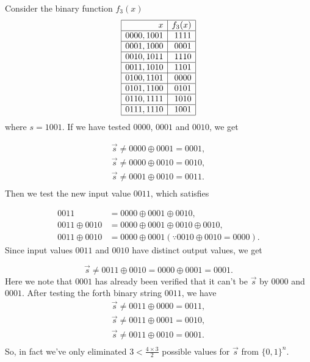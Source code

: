 \begin{example}
Consider the binary function $f_3(x)$
\begin{equation}
    \begin{array}{|r|r|}
	\hline x & f_3(x) \\
	\hline 0000,1001 & 1111 \\
	\hline 0001,1000 & 0001 \\
	\hline 0010,1011 & 1110 \\
	\hline 0011,1010 & 1101 \\
	\hline 0100,1101 & 0000 \\
	\hline 0101,1100 & 0101 \\
	\hline 0110,1111 & 1010 \\
	\hline 0111,1110 & 1001 \\
	\hline
\end{array}
\end{equation}
where $s=1001$. If we have tested $0000$, $0001$ and $0010$, we get

\begin{equation}
\begin{aligned}
	\vec{s} \neq 0000 \oplus 0001 = 0001, \\
	\vec{s} \neq 0000 \oplus 0010 = 0010, \\
	\vec{s} \neq 0001 \oplus 0010 = 0011. \\
\end{aligned}
\end{equation}
Then we test the new input value $0011$, which satisfies

\begin{equation}
\begin{aligned}
0011 &= 0000 \oplus 0001 \oplus 0010,\\
0011 \oplus 0010 &= 0000 \oplus 0001 \oplus0010 \oplus0010 ,\\
0011 \oplus 0010 &= 0000 \oplus 0001 (\because 0010 \oplus 0010 = 0000).
\end{aligned}
\end{equation}
Since input values $0011$ and $0010$ have distinct output values, we get 

\begin{equation}
    \vec{s} \neq 0011 \oplus 0010 = 0000 \oplus 0001 = 0001.
\end{equation}
Here we note that $0001$ has already been verified that it can't be $\vec{s}$ by $0000$ and $0001$. After testing the forth binary string $0011$, we have
\begin{equation}
\begin{aligned}
	\vec{s} \neq 0011 \oplus 0000 = 0011, \\
	\vec{s} \neq 0011 \oplus 0001 = 0010, \\
	\vec{s} \neq 0011 \oplus 0010 = 0001. \\
\end{aligned}
\end{equation}
So, in fact we've only eliminated $3 < \frac{4 \times 3}{2}$ possible values for $\vec{s}$ from $\{0,1\}^n$.
\end{example}